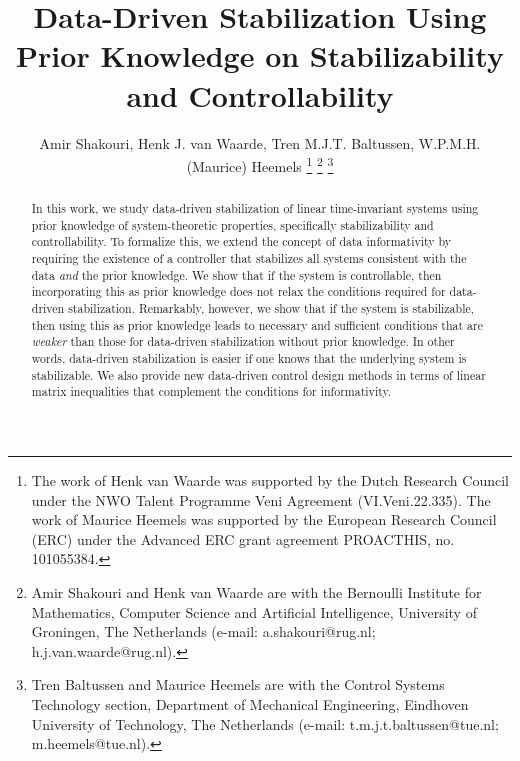 \documentclass[9pt,shortpaper,twoside,web]{ieeecolor}
\begin{document}
\title{Data-Driven Stabilization Using Prior Knowledge on Stabilizability and Controllability}
\author{Amir Shakouri, %
Henk J. van Waarde, Tren M.J.T. Baltussen, W.P.M.H. (Maurice) Heemels%
\thanks{The work of Henk van Waarde was supported by
the Dutch Research Council under the NWO Talent Programme Veni
Agreement (VI.Veni.22.335). The work of Maurice Heemels was supported by the European Research Council (ERC) under the Advanced ERC grant agreement PROACTHIS, no. 101055384.}
\thanks{Amir Shakouri and Henk van Waarde are with the Bernoulli Institute for Mathematics, Computer Science and Artificial Intelligence, University of Groningen, The Netherlands (e-mail: a.shakouri@rug.nl; h.j.van.waarde@rug.nl). }
\thanks{Tren Baltussen and Maurice Heemels are with  the Control Systems Technology section, Department of Mechanical Engineering, Eindhoven
University of Technology, The Netherlands
(e-mail: t.m.j.t.baltussen@tue.nl; 
m.heemels@tue.nl).}
}

\maketitle

\thispagestyle{empty}
\pagestyle{empty}

\begin{abstract}
In this work, we study data-driven stabilization of linear time-invariant systems using prior knowledge of system-theoretic properties, specifically stabilizability and controllability. To formalize this, we extend the concept of data informativity by requiring the existence of a controller that stabilizes all systems consistent with the data \emph{and} the prior knowledge. We show that if the system is controllable, then incorporating this as prior knowledge does not relax the conditions required for data-driven stabilization. Remarkably, however, we show that if the system is stabilizable, then using this as prior knowledge leads to necessary and sufficient conditions that are \emph{weaker} than those for data-driven stabilization without prior knowledge. In other words, data-driven stabilization is easier if one knows that the underlying system is stabilizable. We also provide new data-driven control design methods in terms of linear matrix inequalities that complement the conditions for informativity.
\end{abstract}
\end{document}
